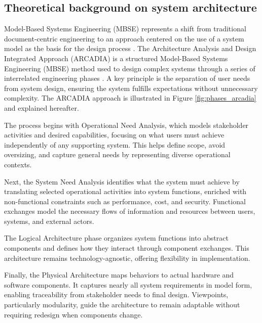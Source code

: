 \documentclass[conference]{IEEEtran}
\begin{document}
\subsection{Theoretical background on system architecture}
Model-Based Systems Engineering (MBSE) represents a shift from traditional document-centric engineering to an approach centered on the use of a system model as the basis for the design process \cite{Roques2018}.
The Architecture Analysis and Design Integrated Approach (ARCADIA) is a structured Model-Based Systems Engineering (MBSE) method used to design complex systems through a series of interrelated engineering phases \cite{arcadia}. A key principle is the separation of user needs from system design, ensuring the system fulfills expectations without unnecessary complexity. The ARCADIA approach is illustrated in Figure \ref{fig:phases_arcadia} and explained hereafter.

The process begins with Operational Need Analysis, which models stakeholder activities and desired capabilities, focusing on what users must achieve independently of any supporting system. This helps define scope, avoid oversizing, and capture general needs by representing diverse operational contexts.

Next, the System Need Analysis identifies what the system must achieve by translating selected operational activities into system functions, enriched with non-functional constraints such as performance, cost, and security. Functional exchanges model the necessary flows of information and resources between users, systems, and external actors.

The Logical Architecture phase organizes system functions into abstract components and defines how they interact through component exchanges. This architecture remains technology-agnostic, offering flexibility in implementation.

Finally, the Physical Architecture maps behaviors to actual hardware and software components. It captures nearly all system requirements in model form, enabling traceability from stakeholder needs to final design. Viewpoints, particularly modularity, guide the architecture to remain adaptable without requiring redesign when components change.
\end{document}
